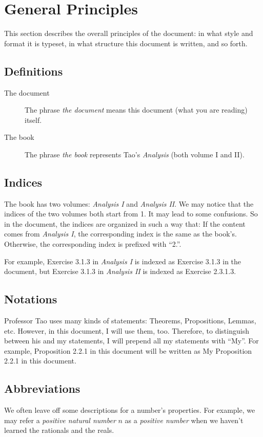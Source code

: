 
\section*{General Principles}
This section describes the overall principles of the document: in what style and format it is typeset,
in what structure this document is written, and so forth.

\subsection*{Definitions}
\begin{description}
\item[The document] The phrase \emph{the document} means this document (what you are reading) itself.
\item[The book] The phrase \emph{the book} represents Tao's \emph{Analysis} (both volume I and II).
\end{description}

\subsection*{Indices}
The book has two volumes: 
\emph{Analysis I} and \emph{Analysis II}. We may notice that the indices of the two volumes both start 
from 1. It may lead to some confusions. So in the document, the indices are organized in such a way that:
If the content comes from \emph{Analysis I}, the corresponding index is the same as the book's. 
Otherwise, the corresponding index is prefixed with ``2.''.

For example, Exercise 3.1.3 in \emph{Analysis I} is indexed as Exercise 3.1.3 in the document, but 
Exercise 3.1.3 in \emph{Analysis II} is indexed as Exercise 2.3.1.3.

\subsection*{Notations}
Professor Tao uses many kinds of statements: Theorems, Propositions, Lemmas, etc. However, in this document, I will use them, too. Therefore, to distinguish between his and my statements,
I will prepend all my statements with ``My''. For example, Proposition 2.2.1 in this document will be written as My Proposition 2.2.1 in this document.

\subsection*{Abbreviations}
We often leave off some descriptions for a number's properties. For example, we may refer a 
\emph{positive natural number} $n$ as a \emph{positive number} when we haven't learned the rationals and 
the reals.